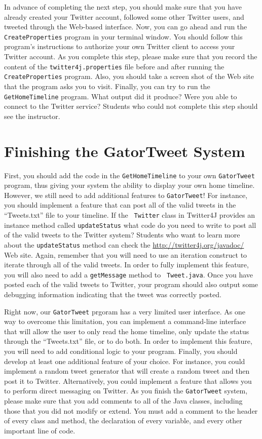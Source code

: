 In advance of completing the next step, you should make sure that you have already created your Twitter account, followed some
other Twitter users, and tweeted through the Web-based interface. Now, you can go ahead and run the {\tt CreateProperties}
program in your terminal window.  You should follow this program's instructions to authorize your own Twitter client to access
your Twitter account.  As you complete this step, please make sure that you record the content of the {\tt twitter4j.properties}
file before and after running the {\tt CreateProperties} program.  Also, you should take a screen shot of the Web site that the
program asks you to visit. Finally, you can try to run the {\tt GetHomeTimeline} program.  What output did it produce? Were you
able to connect to the Twitter service? Students who could not complete this step should see the instructor.

\section*{Finishing the GatorTweet System}
  
First, you should add the code in the {\tt GetHomeTimeline} to your own {\tt GatorTweet} program, thus giving your system the
ability to display your own home timeline.  However, we still need to add additional features to {\tt GatorTweet}!  For instance, you
should implement a feature that can post all of the valid tweets in the ``Tweets.txt'' file to your timeline.  If the {\tt
  Twitter} class in Twitter4J provides an instance method called {\tt updateStatus} what code do you need to write to post all of
the valid tweets to the Twitter system?  Students who want to learn more about the {\tt updateStatus} method can check the
\url{http://twitter4j.org/javadoc/} Web site.  Again, remember that you will need to use an iteration construct to iterate through
all of the valid tweets.  In order to fully implement this feature, you will also need to add a {\tt getMessage} method to {\tt
  Tweet.java}. Once you have posted each of the valid tweets to Twitter, your program should also output some debugging
information indicating that the tweet was correctly posted.  

  Right now, our {\tt GatorTweet} prgoram has a very limited user interface.  As one way to overcome this limitation, you can 
  implement a command-line interface that will allow the user to only read the home timeline, only update the status through the
  ``Tweets.txt'' file, or to do both.  In order to implement this feature, you will need to add conditional logic to your program.
  Finally, you should develop at least one additional feature of your choice.  For instance, you could implement a random tweet
  generator that will create a random tweet and then post it to Twitter. Alternatively, you could implement a feature that allows
  you to perform direct messaging on Twitter. As you finish the {\tt GatorTweet} system, please make sure that you add comments to
  all of the Java classes, including those that you did not modify or extend. You must add a comment to the header of every
  class and method, the declaration of every variable, and every other important line of code. 

